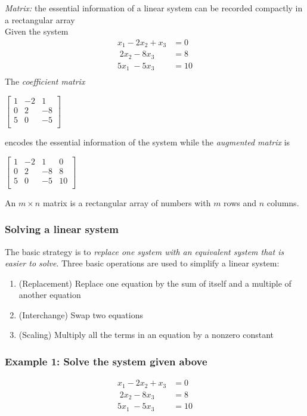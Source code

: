 \documentclass[12pt]{article} %
\begin{document}
\emph{Matrix:} the essential information of a linear system can be recorded compactly in a rectangular array\\
Given the system
\begin{align*}
x_1 - 2x_2 + x_3 &= 0\\
\;	2x_2 - 8x_3 &= 8\\
5x_1\; 	- 5x_3 &= 10\\
\end{align*}
The \emph{coefficient matrix}
\begin{center}
	$\begin{bmatrix}
		1 & -2 & 1\\ 
		0 & 2 & -8 \\
		5 & 0 & -5\\
	\end{bmatrix}$
\end{center}
encodes the essential information of the system while the \emph{augmented matrix} is \\
\begin{center}
	$\begin{bmatrix}
		1 & -2 & 1 & 0\\ 
		0 & 2 & -8 & 8\\
		5 & 0 & -5 & 10\\
	 \end{bmatrix}$
\end{center}

An $m \times n$ matrix is a rectangular array of numbers with $m$ rows and $n$ columns.

\subsubsection{Solving a linear system}
The basic strategy is to \emph{replace one system with an equivalent system that is easier to solve}. Three basic operations are used to simplify a linear system: 
\begin{enumerate}
\item (Replacement) Replace one equation by the sum of itself and a multiple of another equation 
\item (Interchange) Swap two equations
\item (Scaling) Multiply all the terms in an equation by a nonzero constant
\end{enumerate}

\subsubsection{Example 1: Solve the system given above}
\begin{align*}
	x_1 - 2x_2 + x_3 &= 0\\
	\;	2x_2 - 8x_3 &= 8\\
	5x_1\; 	- 5x_3 &= 10\\
\end{align*}
\end{document}
